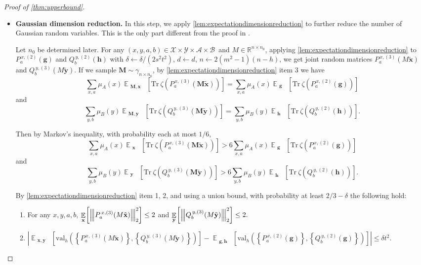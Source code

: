\documentclass[10pt,a4paper]{article}
\theoremstyle{plain}
\theoremstyle{definition}
\newcommand {\minusspace} {\: \! \!}
\newcommand {\Fn} [2] {\ensuremath{ #1 \minusspace \Br{ #2 } }}
\newcommand{\reals}{{\mathbb R}}
\newcommand {\set} [1] {\ensuremath{ \left\lbrace #1 \right\rbrace }}
\newcommand {\br} [1] {\ensuremath{ \left( #1 \right) }}
\newcommand {\Br} [1] {\ensuremath{ \left[ #1 \right] }}
\newcommand {\ab} [1] {\ensuremath{ \left| #1 \right| }}
\DeclareMathOperator*{\bigE}{\mathbb{E}}
\newcommand {\expec} [2] {\Fn{\bigE_{\substack{#1}}}{#2}}
\newcommand{\nnorm}[1]{{\left\vert\kern-0.25ex\left\vert\kern-0.25ex\left\vert #1
		\right\vert\kern-0.25ex\right\vert\kern-0.25ex\right\vert}}
\newcommand {\Tr} {\ensuremath{ \mathrm{Tr} }}
\newcommand {\id} {\ensuremath{\mathds{1}}}
\newcommand{\randg}{\ensuremath{\mathbf{g}}}
\newcommand{\randh}{\ensuremath{\mathbf{h}}}
\newcommand{\randx}{\ensuremath{\mathbf{x}}}
\newcommand{\randy}{\ensuremath{\mathbf{y}}}
\newcommand{\randM}{\ensuremath{\mathbf{M}}}
\newcommand{\gval}[3]{\ensuremath{\mathrm{val}_{#1}\br{\set{#2},\set{#3}}}}
\newcommand{\fourtuples}{\ensuremath{\br{x,y,a,b}\in\calX\times\calY\times\calA\times\calB}}
\newcommand{\Pnn}[1] {\ensuremath{{P^{\,x, (#1)}_a}}}
\newcommand{\Qnn}[1] {\ensuremath{{Q^{\,y, (#1)}_b}}}
\newcommand{\calX}{\mathcal{X}}
\newcommand{\calY}{\mathcal{Y}}
\newcommand{\calA}{\mathcal{A}}
\newcommand{\calB}{\mathcal{B}}
\newcommand{\1}{\mathbb{1}} %
\begin{document}
\begin{proof}[Proof of \cref{thm:upperbound}]
\begin{itemize}
\begin{enumerate}
$\displaystyle\sum_{y,b}\mu_B(y)\ab{\frac{1}{m^h}\expec{}{\Tr~\zeta\br{{\Qnn{2}(\randh)}}}-\frac{1}{m^n}\Tr~\zeta\br{\Qnn{1}}}\leq O\br{t\br{3^dm^{d/2}\sqrt{\tau}d}^{2/3}}$.
\item For any $x,y$, $\sum_{a\in\calA}\Pnn{2}(\randg)=\sum_{b\in\calB}\Qnn{2}(\randh)=\id.$
	\end{enumerate}
	
\item \textbf{Gaussian dimension reduction.} 
In this step, we apply \cref{lem:expectationdimensionreduction} to further reduce the number of Gaussian random variables.
This is the only part different from the proof in \cite{qin2021nonlocal}.

	Let $n_0$ be determined later. 
	For any \fourtuples~and $M\in\reals^{n\times n_0}$, applying \cref{lem:expectationdimensionreduction} to $\Pnn{2}(\randg)$ and $\Qnn{2}(\randh)$ with $\delta\gets\delta/\br{2s^2t^2}$, $d\gets d$, $n\gets 2(m^2-1)(n-h)$, we get joint random matrices $\Pnn{3}(M\tilde{\randx})$ and $\Qnn{3}(M\tilde{\randy})$. If we sample $\randM\sim\gamma_{n\times n_0}$, by \cref{lem:expectationdimensionreduction} item 3 we have
\[\sum_{x,a}\mu_A(x)\expec{\randM,\randx}{\Tr~\zeta\br{\Pnn{3}(\randM\tilde{\randx})}}=\sum_{x,a}\mu_A(x)\expec{\randg}{\Tr~\zeta\br{\Pnn{2}(\randg)}}\]and\[\sum_{y,b}\mu_B(y)\expec{\randM,\randy}{\Tr~\zeta\br{\Qnn{3}(\randM\tilde{\randy})}}=\sum_{y,b}\mu_B(y)\expec{\randh}{\Tr~\zeta\br{\Qnn{2}(\randh)}}.\]

Then by Markov's inequality, with probability each at most $1/6$, 
\[\sum_{x,a}\mu_A(x)\expec{ \randx}{\Tr~\zeta\br{\Pnn{3}(\randM\tilde{\randx})}}>6\sum_{x,a}\mu_A(x)\expec{\randg}{\Tr~\zeta\br{\Pnn{2}(\randg)}}\]and\[\sum_{y,b}\mu_B(y)\expec{ \randy}{\Tr~\zeta\br{\Qnn{3}(\randM\tilde{\randy})}}>6\sum_{y,b}\mu_B(y)\expec{\randh}{\Tr~\zeta\br{\Qnn{2}(\randh)}}.\]

By \cref{lem:expectationdimensionreduction} item 1, 2, and using a union bound, with probability at least $2/3-\delta$ the following hold:

\begin{enumerate}
\item For any $x,y,a,b$, $\displaystyle\expec{ \randx}{\nnorm{\Pnn{3}(M\tilde{\randx})}_2^2}\leq2$ and
$\displaystyle\expec{ \randy}{\nnorm{\Qnn{3}(M\tilde{\randy})}_2^2}\leq2.$

\item $\displaystyle\ab{\expec{\randx,\randy}{\gval{h}{\Pnn{3}(M\tilde{\randx})}{\Qnn{3}(M\tilde{\randy})}}-\expec{\randg,\randh}{\gval{h}{\Pnn{2}(\randg)}{\Qnn{2}(\randg)}}}\leq\delta t^2.$


\end{enumerate}
\end{itemize}
\end{proof}
\end{document}
